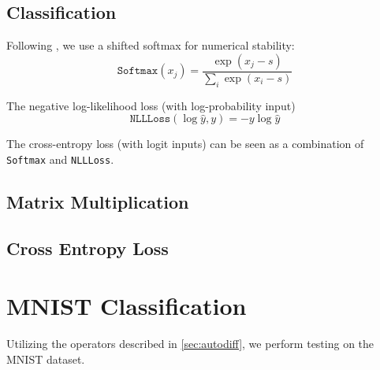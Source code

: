 \documentclass{lucas-report}
\begin{document}
\subsection{Classification}

Following \cite{accurate-softmax}, we use a shifted softmax for numerical stability:
\[
  \texttt{Softmax}(x_j) = \frac{\exp{(x_j - s)}}{\sum_i{\exp{(x_i - s)}}}
\]

The negative log-likelihood loss (with log-probability input)
\[
  \texttt{NLLLoss}(\log\hat{y}, y) = -y \log \hat{y}
\]

The cross-entropy loss (with logit inputs) can be seen as a combination of \texttt{Softmax} and \texttt{NLLLoss}.



\subsection{Matrix Multiplication}


\subsection{Cross Entropy Loss}



\section{MNIST Classification}

Utilizing the operators described in \autoref{sec:autodiff},
we perform testing on the MNIST dataset.


\printbibliography
\end{document}
